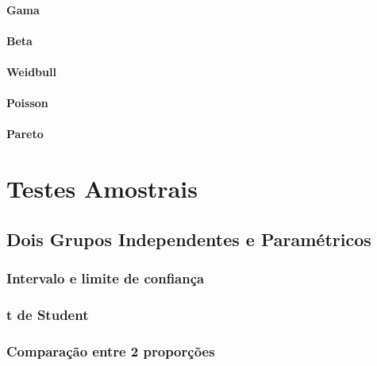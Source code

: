 \documentclass[
]{book}
\begin{document}
\hypertarget{gama}{%
\subsection{Gama}\label{gama}}

\hypertarget{beta}{%
\subsection{Beta}\label{beta}}

\hypertarget{weidbull}{%
\subsection{Weidbull}\label{weidbull}}

\hypertarget{poisson}{%
\subsection{Poisson}\label{poisson}}

\hypertarget{pareto}{%
\subsection{Pareto}\label{pareto}}

\hypertarget{part-testes-amostrais}{%
\part{Testes Amostrais}\label{part-testes-amostrais}}

\hypertarget{dois-grupos-independentes-e-paramuxe9tricos}{%
\chapter{Dois Grupos Independentes e Paramétricos}\label{dois-grupos-independentes-e-paramuxe9tricos}}

\hypertarget{intervalo-e-limite-de-confianuxe7a}{%
\section{Intervalo e limite de confiança}\label{intervalo-e-limite-de-confianuxe7a}}

\hypertarget{t-de-student-1}{%
\section{t de Student}\label{t-de-student-1}}

\hypertarget{comparauxe7uxe3o-entre-2-proporuxe7uxf5es}{%
\section{Comparação entre 2 proporções}\label{comparauxe7uxe3o-entre-2-proporuxe7uxf5es}}
\end{document}
